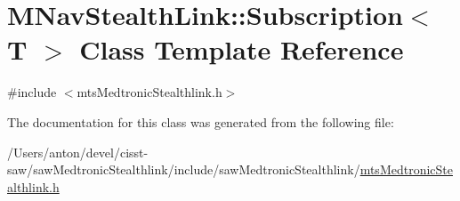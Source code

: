 \hypertarget{class_m_nav_stealth_link_1_1_subscription}{}\section{M\+Nav\+Stealth\+Link\+:\+:Subscription$<$ T $>$ Class Template Reference}
\label{class_m_nav_stealth_link_1_1_subscription}


{\ttfamily \#include $<$mts\+Medtronic\+Stealthlink.\+h$>$}



The documentation for this class was generated from the following file\+:\begin{DoxyCompactItemize}
\item 
/\+Users/anton/devel/cisst-\/saw/saw\+Medtronic\+Stealthlink/include/saw\+Medtronic\+Stealthlink/\hyperlink{mts_medtronic_stealthlink_8h}{mts\+Medtronic\+Stealthlink.\+h}\end{DoxyCompactItemize}
